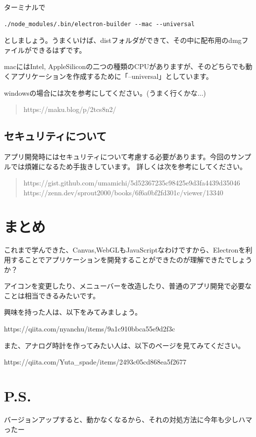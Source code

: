 \documentclass[mingoth,11pt,a4j,uplatex]{jsarticle}
\begin{document}
ターミナルで
\begin{verbatim}
./node_modules/.bin/electron-builder --mac --universal
\end{verbatim}
としましょう。うまくいけば、distフォルダができて、その中に配布用のdmgファイルができるはずです。

macにはIntel, AppleSiliconの二つの種類のCPUがありますが、そのどちらでも動くアプリケーションを作成するために「--universal」としています。

windowsの場合には次を参考にしてください。(うまく行くかな...)
\begin{quote}
https://maku.blog/p/2tcs8n2/
\end{quote}

\subsection{セキュリティについて}
アプリ開発時にはセキュリティについて考慮する必要があります。今回のサンプルでは煩雑になるため手抜きしています。
詳しくは次を参考にしてください。
\begin{quote}
https://gist.github.com/umamichi/5d52367235c98425e9d3fa4439d35046\\
https://zenn.dev/sprout2000/books/6f6a0bf2fd301c/viewer/13340
\end{quote}

\section{まとめ}
これまで学んできた、Canvas,WebGLもJavaScriptなわけですから、Electronを利用することでアプリケーションを開発することができたのが理解できたでしょうか？

\vspace{1em}
アイコンを変更したり、メニューバーを改造したり、普通のアプリ開発で必要なことは相当できるみたいです。

興味を持った人は、以下をみてみましょう。

https://qiita.com/nyanchu/items/9a1c910bbca55e9d2f3c

また、アナログ時計を作ってみたい人は、以下のページを見てみてください。

https://qiita.com/Yuta\_spade/items/2493c05cd868ea5f2677

\section*{P.S.}
バージョンアップすると、動かなくなるから、それの対処方法に今年も少しハマったー


\end{document}
